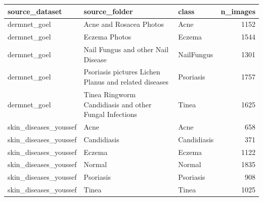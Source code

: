 \begin{tabular}{lllr}
\toprule
source\_dataset & source\_folder & class & n\_images \\
\midrule
dermnet\_goel & Acne and Rosacea Photos & Acne & 1152 \\
dermnet\_goel & Eczema Photos & Eczema & 1544 \\
dermnet\_goel & Nail Fungus and other Nail Disease & NailFungus & 1301 \\
dermnet\_goel & Psoriasis pictures Lichen Planus and related diseases & Psoriasis & 1757 \\
dermnet\_goel & Tinea Ringworm Candidiasis and other Fungal Infections & Tinea & 1625 \\
skin\_diseases\_youssef & Acne & Acne & 658 \\
skin\_diseases\_youssef & Candidiasis & Candidiasis & 371 \\
skin\_diseases\_youssef & Eczema & Eczema & 1122 \\
skin\_diseases\_youssef & Normal & Normal & 1835 \\
skin\_diseases\_youssef & Psoriasis & Psoriasis & 908 \\
skin\_diseases\_youssef & Tinea & Tinea & 1025 \\
\bottomrule
\end{tabular}
